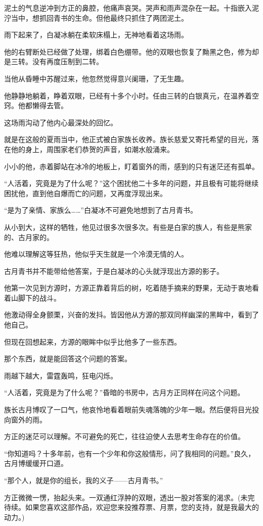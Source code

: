 \begin{this_body}
泥土的气息逆冲到方正的鼻腔，他痛声哀哭。哭声和雨声混杂在一起。十指嵌入泥泞当中，想抓回青书的生命。但他最终只抓住了两团泥土。

雨下起来了，白凝冰躺在柔软床榻上，无神地看着这场雨。

他的右臂断处已经做了处理，绑着白色绷带。他的双眼也恢复了黝黑之色，修为却是三转。没有再度压制到二转。

当他从昏睡中苏醒过来，他忽然觉得意兴阑珊，了无生趣。

他静静地躺着，睁着双眼，已经有十多个小时。任由三转的白银真元，在温养着空窍。他都懒得去管。

这场雨沟动了他内心最深处的回忆。

就是在这般的夏雨当中，他正式被白家族长收养。族长慈爱又寄托希望的目光，落在他的身上，周围家老们恭贺的声音，如潮水般涌来。

小小的他，赤着脚站在冰冷的地板上，盯着窗外的雨，感到的只有迷茫还有孤单。

“人活着，究竟是为了什么呢？”这个困扰他二十多年的问题，并且极有可能将继续困扰他，直到他自爆而亡的问题，又再度浮现出来。

“是为了亲情、家族么……”白凝冰不可避免地想到了古月青书。

从小到大，这样的牺牲，他见过很多次很多次。有些是白家的族人，有些是熊家的、古月家的。

他难以理解这等狂热，他似乎天生就是一个冷漠无情的人。

古月青书并不能带给他答案，于是白凝冰的心头就浮现出方源的影子。

他第一次见到方源时，方源正靠着背后的树，吃着随手摘来的野果，无动于衷地看着山脚下的战斗。

他激动得全身颤栗，兴奋的发抖。皆因他从方源的那双同样幽深的黑眸中，看到了他自己。

但现在回想起来，方源的眼眸中似乎比他多了一些东西。

那个东西，就是能回答这个问题的答案。

雨越下越大，雷霆轰鸣，狂电闪烁。

“人活着，究竟是为了什么呢？”昏暗的书房中，古月方正同样在问这个问题。

族长古月博叹了一口气，他哀怜地看着眼前失魂落魄的少年一眼。然后便将目光投向窗外的雨。

方正的迷茫可以理解。不可避免的死亡，往往迫使人去思考生命存在的价值。

“你知道吗？十多年前，也有一个少年和你这般情形，问了我相同的问题。”良久，古月博缓缓开口道。

“那个人，就是你的组长，我的义子——古月青书。”

方正微微一愣，抬起头来。一双通红浮肿的双眼，透出一股对答案的渴求。(未完待续。如果您喜欢这部作品，欢迎您来投推荐票、月票，您的支持，就是我最大的动力。)

\end{this_body}

